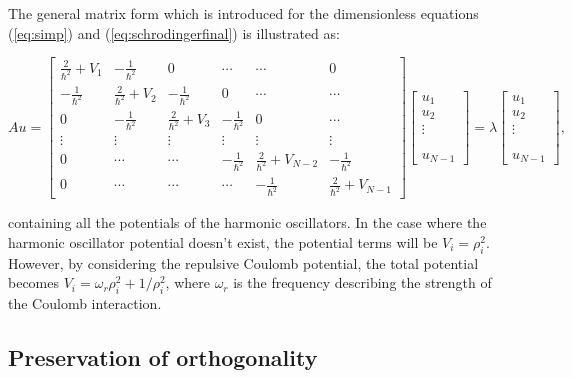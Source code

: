 \documentclass[12pt, a4paper, reqno, article]{amsart}
\begin{document}
The general matrix form which is introduced for the dimensionless equations (\ref{eq:simp}) and (\ref{eq:schrodingerfinal}) is illustrated as:
\begin{center}
\begin{equation}
{Au} =
\begin{bmatrix}
  \frac{2}{\hbar^{2}} + V_{1} & -\frac{1}{\hbar^{2}} & 0 & \cdots & \cdots & 0 \\
  -\frac{1}{\hbar^{2}} & \frac{2}{\hbar^{2}} + V_{2} &  -\frac{1}{\hbar^{2}} & 0 &\cdots & \cdots \\
  0 & -\frac{1}{\hbar^{2}} & \frac{2}{\hbar^{2}} + V_{3} & -\frac{1}{\hbar^{2}} & 0 & \cdots \\
  \vdots & \vdots & \vdots & \vdots & \vdots & \vdots \\
  0 & \cdots & \cdots & -\frac{1}{\hbar^{2}} & \frac{2}{\hbar^{2}} + V_{N-2} & -\frac{1}{\hbar^{2}} \\
  0 & \cdots & \cdots & \cdots & -\frac{1}{\hbar^{2}} & \frac{2}{\hbar^{2}} + V_{N-1}
\end{bmatrix}
\begin{bmatrix}
	u_{1} \\
	u_{2} \\
	\vdots \\
	\\
	\\
	u_{N-1}
\end{bmatrix}
=	\lambda
\begin{bmatrix}
	u_{1} \\
	u_{2} \\
	\vdots \\
	\\
	\\
	u_{N-1}
\end{bmatrix},
\end{equation}
\end{center}

containing all the potentials of the harmonic oscillators. In the case where the harmonic oscillator potential doesn't exist, the potential terms will be \(V_{i}=\rho_{i}^{2}\). However, by considering the repulsive Coulomb potential, the total potential
becomes \(V_{i}=\omega_{r}\rho_{i}^{2}+1/\rho_{i}^{2}\), where \(\omega_{r}\) is the frequency describing the strength of the Coulomb interaction.

\subsection{Preservation of orthogonality}
\end{document}
